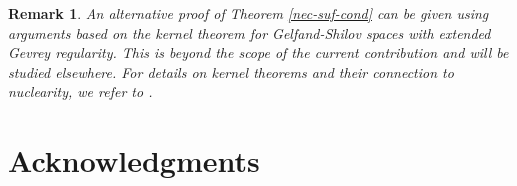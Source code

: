 \documentclass{article}
\theoremstyle{thmstyleone}
\theoremstyle{thmstyletwo}%
\newtheorem{Remark}[Theorem]{Remark}%
\theoremstyle{thmstylethree}%
\begin{document}
\par

\begin{Remark}
An alternative proof of Theorem \ref{nec-suf-cond} can be given using arguments based on the kernel theorem for Gelfand-Shilov spaces with extended Gevrey regularity. This is beyond the scope of the current contribution and will be studied elsewhere. For details on kernel theorems and their connection to nuclearity, we refer to \cite{DNV2021}.
\end{Remark}







\section{Acknowledgments}
\end{document}
